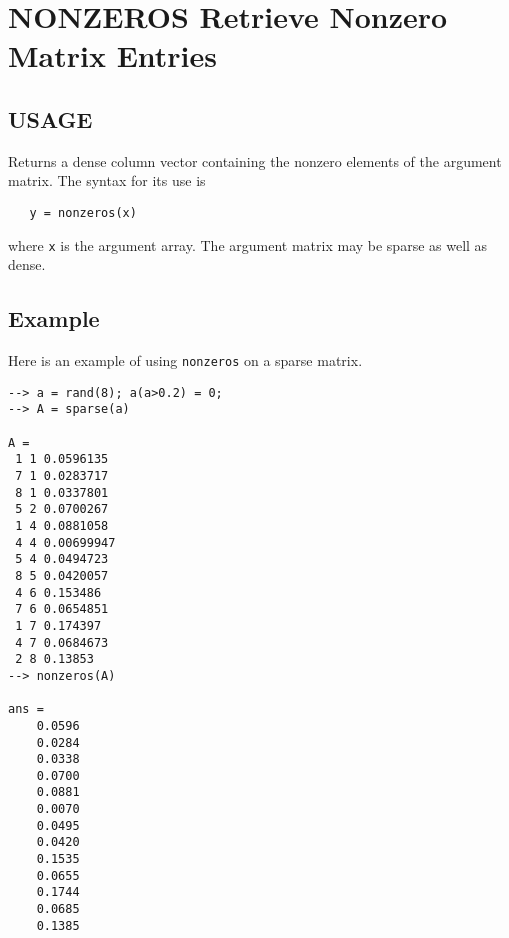 \section{NONZEROS Retrieve Nonzero Matrix Entries}

\subsection{USAGE}

Returns a dense column vector containing the nonzero elements
of the argument matrix.  The syntax for its use is
\begin{verbatim}
   y = nonzeros(x)
\end{verbatim}
where \verb|x| is the argument array.  The argument matrix may
be sparse as well as dense.
\subsection{Example}

Here is an example of using \verb|nonzeros| on a sparse matrix.
\begin{verbatim}
--> a = rand(8); a(a>0.2) = 0;
--> A = sparse(a)

A = 
 1 1 0.0596135
 7 1 0.0283717
 8 1 0.0337801
 5 2 0.0700267
 1 4 0.0881058
 4 4 0.00699947
 5 4 0.0494723
 8 5 0.0420057
 4 6 0.153486
 7 6 0.0654851
 1 7 0.174397
 4 7 0.0684673
 2 8 0.13853
--> nonzeros(A)

ans = 
    0.0596 
    0.0284 
    0.0338 
    0.0700 
    0.0881 
    0.0070 
    0.0495 
    0.0420 
    0.1535 
    0.0655 
    0.1744 
    0.0685 
    0.1385 
\end{verbatim}
